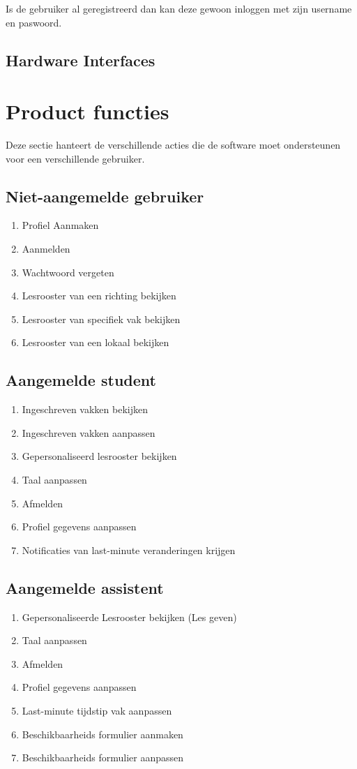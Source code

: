 Is de gebruiker al geregistreerd dan kan deze gewoon inloggen met zijn username en paswoord.  

\subsection{Hardware Interfaces}

\section{Product functies}
Deze sectie hanteert de verschillende acties die de software moet ondersteunen voor een verschillende gebruiker.

\subsection{Niet-aangemelde gebruiker}
\begin{enumerate}
    \item Profiel Aanmaken
    \item Aanmelden
    \item Wachtwoord vergeten
    \item Lesrooster van een richting bekijken
    \item Lesrooster van specifiek vak bekijken
    \item Lesrooster van een lokaal bekijken
\end{enumerate}

\subsection{Aangemelde student}
\begin{enumerate}
    \item Ingeschreven vakken bekijken
    \item Ingeschreven vakken aanpassen
    \item Gepersonaliseerd lesrooster bekijken
    \item Taal aanpassen
    \item Afmelden
    \item Profiel gegevens aanpassen
    \item Notificaties van last-minute veranderingen krijgen
\end{enumerate}

\subsection{Aangemelde assistent}
\begin{enumerate}
    \item Gepersonaliseerde Lesrooster bekijken (Les geven)
    \item Taal aanpassen
    \item Afmelden
    \item Profiel gegevens aanpassen
    \item Last-minute tijdstip vak aanpassen 
    \item Beschikbaarheids formulier aanmaken
    \item Beschikbaarheids formulier aanpassen
\end{enumerate}

